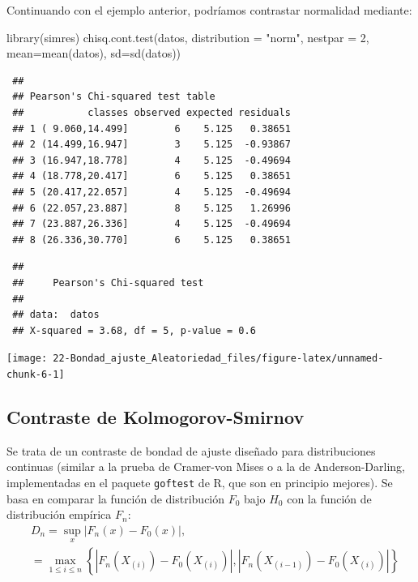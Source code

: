 \documentclass[
  10pt,
]{book}
\newenvironment{Shaded}{\begin{snugshade}}{\end{snugshade}}
\newcommand{\AttributeTok}[1]{\textcolor[rgb]{0.77,0.63,0.00}{#1}}
\newcommand{\DecValTok}[1]{\textcolor[rgb]{0.00,0.00,0.81}{#1}}
\newcommand{\FunctionTok}[1]{\textcolor[rgb]{0.00,0.00,0.00}{#1}}
\newcommand{\NormalTok}[1]{#1}
\newcommand{\StringTok}[1]{\textcolor[rgb]{0.31,0.60,0.02}{#1}}
\theoremstyle{break}
\theoremstyle{nonumberplain}
\begin{document}
Continuando con el ejemplo anterior, podríamos contrastar normalidad mediante:

\begin{Shaded}
\begin{Highlighting}[]
\FunctionTok{library}\NormalTok{(simres)}
\FunctionTok{chisq.cont.test}\NormalTok{(datos, }\AttributeTok{distribution =} \StringTok{"norm"}\NormalTok{, }\AttributeTok{nestpar =} \DecValTok{2}\NormalTok{, }\AttributeTok{mean=}\FunctionTok{mean}\NormalTok{(datos), }\AttributeTok{sd=}\FunctionTok{sd}\NormalTok{(datos))}
\end{Highlighting}
\end{Shaded}

\begin{verbatim}
 ## 
 ## Pearson's Chi-squared test table
 ##           classes observed expected residuals
 ## 1 ( 9.060,14.499]        6    5.125   0.38651
 ## 2 (14.499,16.947]        3    5.125  -0.93867
 ## 3 (16.947,18.778]        4    5.125  -0.49694
 ## 4 (18.778,20.417]        6    5.125   0.38651
 ## 5 (20.417,22.057]        4    5.125  -0.49694
 ## 6 (22.057,23.887]        8    5.125   1.26996
 ## 7 (23.887,26.336]        4    5.125  -0.49694
 ## 8 (26.336,30.770]        6    5.125   0.38651
\end{verbatim}

\begin{verbatim}
 ## 
 ##     Pearson's Chi-squared test
 ## 
 ## data:  datos
 ## X-squared = 3.68, df = 5, p-value = 0.6
\end{verbatim}

\begin{center}\texttt{[image: 22-Bondad\_ajuste\_Aleatoriedad\_files/figure-latex/unnamed-chunk-6-1]} \end{center}

\hypertarget{ks-test}{%
\subsection{Contraste de Kolmogorov-Smirnov}\label{ks-test}}

Se trata de un contraste de bondad de ajuste diseñado para distribuciones continuas
(similar a la prueba de Cramer-von Mises o a la de Anderson-Darling, implementadas en el paquete \texttt{goftest} de R, que son en principio mejores).
Se basa en comparar la función de distribución \(F_0\) bajo \(H_0\) con la función de distribución empírica \(F_n\):
\[\begin{aligned}
& D_n=\sup_{x}|F_n(x)-F_0(x)|,\\
& = \max_{1 \leq i \leq n} \left\{ |F_n(X_{(i)})-F_0(X_{(i)})|,|F_n(X_{(i-1)})-F_0(X_{(i)})| \right\}
\end{aligned}\]
\end{document}
